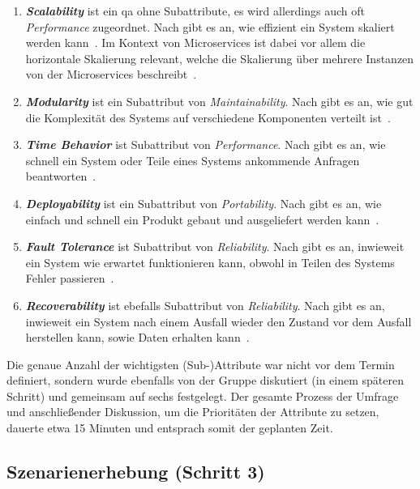 \begin{enumerate}
	\item \textbf{\emph{Scalability}} ist ein \gls{qa} ohne Subattribute, es wird allerdings auch oft \emph{Performance} zugeordnet. Nach  gibt es an, wie effizient ein System skaliert werden kann~\cite{koch-scalability-1}. Im Kontext von Microservices ist dabei vor allem die horizontale Skalierung relevant, welche die Skalierung über mehrere Instanzen von der Microservices beschreibt~\cite{koch-scalability-2}.
	\item \textbf{\emph{Modularity}} ist ein Subattribut von \emph{Maintainability}. Nach  gibt es an, wie gut die Komplexität des Systems auf verschiedene Komponenten verteilt ist~\cite{ISO-25010}.
	\item \textbf{\emph{Time Behavior}} ist Subattribut von \emph{Performance}. Nach  gibt es an, wie schnell ein System oder Teile eines Systems ankommende Anfragen beantworten~\cite{ISO-25010,koch-time-behavior-1,koch-time-behavior-2}.
	\item \textbf{\emph{Deployability}} ist ein Subattribut von \emph{Portability}. Nach  gibt es an, wie einfach und schnell ein Produkt gebaut und ausgeliefert werden kann~\cite{koch-scalability-1,koch-deployability}.
	\item \textbf{\emph{Fault Tolerance}} ist Subattribut von \emph{Reliability}. Nach  gibt es an, inwieweit ein System wie erwartet funktionieren kann, obwohl in Teilen des Systems Fehler passieren~\cite{ISO-25010,koch-fault-tolerance}.
	\item \textbf{\emph{Recoverability}} ist ebefalls Subattribut von \emph{Reliability}. Nach  gibt es an, inwieweit ein System nach einem Ausfall wieder den Zustand vor dem Ausfall herstellen kann, sowie Daten erhalten kann~\cite{ISO-25010}.
\end{enumerate}
Die genaue Anzahl der wichtigsten (Sub-)Attribute war nicht vor dem Termin definiert, sondern wurde ebenfalls von der Gruppe diskutiert (in einem späteren Schritt) und gemeinsam auf sechs festgelegt.
Der gesamte Prozess der Umfrage und anschließender Diskussion, um die Prioritäten der Attribute zu setzen, dauerte etwa 15 Minuten und entsprach somit der geplanten Zeit.

\subsection{Szenarienerhebung (Schritt 3)}

